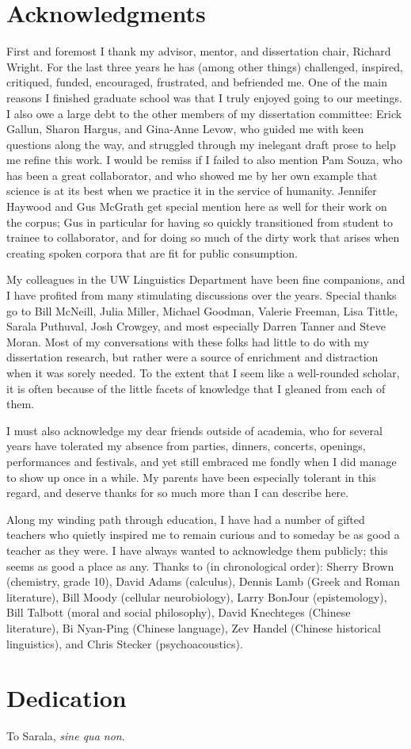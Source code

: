 \chapter*{Acknowledgments}
First and foremost I thank my advisor, mentor, and dissertation chair, Richard Wright.  For the last three years he has (among other things) challenged, inspired, critiqued, funded, encouraged, frustrated, and befriended me.  One of the main reasons I finished graduate school was that I truly enjoyed going to our meetings.  I also owe a large debt to the other members of my dissertation committee: Erick Gallun, Sharon Hargus, and Gina-Anne Levow, who guided me with keen questions along the way, and struggled through my inelegant draft prose to help me refine this work.  I would be remiss if I failed to also mention Pam Souza, who has been a great collaborator, and who showed me by her own example that science is at its best when we practice it in the service of humanity.  Jennifer Haywood and Gus McGrath get special mention here as well for their work on the corpus; Gus in particular for having so quickly transitioned from student to trainee to collaborator, and for doing so much of the dirty work that arises when creating spoken corpora that are fit for public consumption.

My colleagues in the UW Linguistics Department have been fine companions, and I have profited from many stimulating discussions over the years.  Special thanks go to Bill McNeill, Julia Miller, Michael Goodman, Valerie Freeman, Lisa Tittle, Sarala Puthuval, Josh Crowgey, and most especially Darren Tanner and Steve Moran.  Most of my conversations with these folks had little to do with my dissertation research, but rather were a source of enrichment and distraction when it was sorely needed.  To the extent that I seem like a well-rounded scholar, it is often because of the little facets of knowledge that I gleaned from each of them.  

I must also acknowledge my dear friends outside of academia, who for several years have tolerated my absence from parties, dinners, concerts, openings, performances and festivals, and yet still embraced me fondly when I did manage to show up once in a while.  My parents have been especially tolerant in this regard, and deserve thanks for so much more than I can describe here.

Along my winding path through education, I have had a number of gifted teachers who quietly inspired me to remain curious and to someday be as good a teacher as they were.  I have always wanted to acknowledge them publicly; this seems as good a place as any.  Thanks to (in chronological order): Sherry Brown (chemistry, grade 10), David Adams (calculus), Dennis Lamb (Greek and Roman literature), Bill Moody (cellular neurobiology), Larry BonJour (epistemology), Bill Talbott (moral and social philosophy), David Knechteges (Chinese literature), Bi Nyan-Ping (Chinese language), Zev Handel (Chinese historical linguistics), and Chris Stecker (psychoacoustics).

\chapter*{Dedication}
To Sarala, \textit{sine qua non}.
